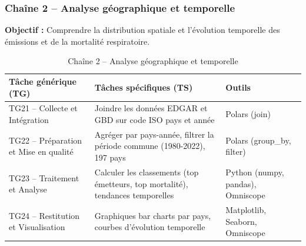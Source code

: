 \documentclass[11pt,a4paper]{article}
\begin{document}
\clearpage
\subsubsection{Chaîne 2 -- Analyse géographique et temporelle}

\textbf{Objectif :} Comprendre la distribution spatiale et l'évolution temporelle des émissions et de la mortalité respiratoire.

\begin{table}[H]
\centering
\caption{Chaîne 2 -- Analyse géographique et temporelle}
\begin{tabular}{p{3.5cm}p{5.5cm}p{4.5cm}}
\toprule
\textbf{Tâche générique (TG)} & \textbf{Tâches spécifiques (TS)} & \textbf{Outils} \\
\midrule
TG21 -- Collecte et Intégration & Joindre les données EDGAR et GBD sur code ISO pays et année & Polars (join) \\
\midrule
TG22 -- Préparation et Mise en qualité & Agréger par pays-année, filtrer la période commune (1980-2022), 197 pays & Polars (group\_by, filter) \\
\midrule
TG23 -- Traitement et Analyse & Calculer les classements (top émetteurs, top mortalité), tendances temporelles & Python (numpy, pandas), Omniscope \\
\midrule
TG24 -- Restitution et Visualisation & Graphiques bar charts par pays, courbes d'évolution temporelle & Matplotlib, Seaborn, Omniscope \\
\bottomrule
\end{tabular}
\end{table}
\end{document}

